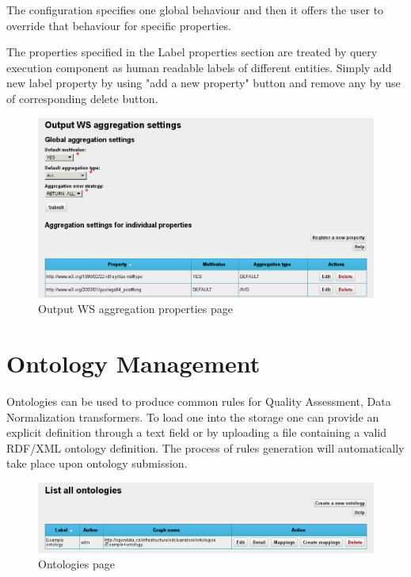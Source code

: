 The configuration specifies one global behaviour and then it offers the user to override that behaviour for specific properties.

The properties specified in the Label properties section are treated by query execution component as human readable labels of different entities. Simply add new label property by using "add a new property" button and remove any by use of corresponding delete button.

\begin{figure}[!ht]
    \centering
    \includegraphics[width=\textwidth]{images/fe-outputws-aggregation.png}
    \caption{Output WS aggregation properties page}
	\label{fig:feOutputWSAggregation}
\end{figure}

\section{Ontology Management}
\label{sec:ontologyManagement}

Ontologies can be used to produce common rules for Quality Assessment, Data Normalization {transformers}. To load one into the storage one can provide an explicit definition through a text field or by uploading a file containing a valid {RDF/XML} ontology definition. The process of rules generation will automatically take place upon ontology submission.

\begin{figure}[!ht]
    \centering
    \includegraphics[width=\textwidth]{images/fe-ontologies.png}
    \caption{Ontologies page}
	\label{fig:feOntologies}
\end{figure}

